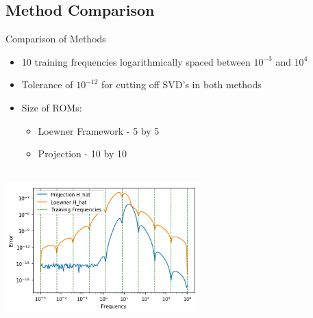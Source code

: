 \subsection{Method Comparison}

\begin{frame}{Comparison of Methods}
\begin{itemize}
\item 10 training frequencies logarithmically spaced between $10^{-3}$ and $10^4$\\
\item Tolerance of $10^{-12}$ for cutting off SVD's
in both methods\\
\bigskip
\item Size of ROMs: \\
\begin{itemize}
    \item Loewner Framework - 5 by 5
    \item Projection - 10 by 10
\end{itemize}
\end{itemize}

\centering
\includegraphics[width=7.5cm, height= 6cm]{figures/comparison0.png}

\end{frame}
